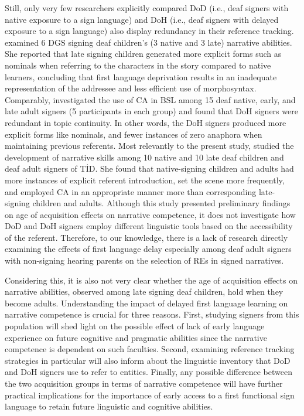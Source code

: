 \documentclass[review]{elsarticle} %
\begin{document}
Still, only very few researchers explicitly compared DoD (i.e., deaf
signers with native exposure to a sign language) and DoH (i.e., deaf
signers with delayed exposure to a sign language) also display
redundancy in their reference tracking. \citet{becker2009} examined 6
DGS signing deaf children's (3 native and 3 late) narrative abilities.
She reported that late signing children generated more explicit forms
such as nominals when referring to the characters in the story compared
to native learners, concluding that first language deprivation results
in an inadequate representation of the addressee and less efficient use
of morphosyntax. Comparably, \citet{cormier2013} investigated the use of
CA in BSL among 15 deaf native, early, and late adult signers (5
participants in each group) and found that DoH signers were redundant in
topic continuity. In other words, the DoH signers produced more explicit
forms like nominals, and fewer instances of zero anaphora when
maintaining previous referents. Most relevantly to the present study,
\citet{gur2018} studied the development of narrative skills among 10
native and 10 late deaf children and deaf adult signers of TİD. She
found that native-signing children and adults had more instances of
explicit referent introduction, set the scene more frequently, and
employed CA in an appropriate manner more than corresponding
late-signing children and adults. Although this study presented
preliminary findings on age of acquisition effects on narrative
competence, it does not investigate how DoD and DoH signers employ
different linguistic tools based on the accessibility of the referent.
Therefore, to our knowledge, there is a lack of research directly
examining the effects of first language delay especially among deaf
adult signers with non-signing hearing parents on the selection of REs
in signed narratives.

Considering this, it is also not very clear whether the age of
acquisition effects on narrative abilities, observed among late signing
deaf children, hold when they become adults. Understanding the impact of
delayed first language learning on narrative competence is crucial for
three reasons. First, studying signers from this population will shed
light on the possible effect of lack of early language experience on
future cognitive and pragmatic abilities since the narrative competence
is dependent on such faculties. Second, examining reference tracking
strategies in particular will also inform about the linguistic inventory
that DoD and DoH signers use to refer to entities. Finally, any possible
difference between the two acquisition groups in terms of narrative
competence will have further practical implications for the importance
of early access to a first functional sign language to retain future
linguistic and cognitive abilities.
\end{document}
